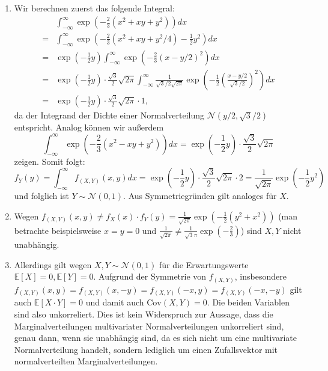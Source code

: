 \documentclass[a4paper]{article}
\begin{document}
\subsection{}

\begin{enumerate}
    \item Wir berechnen zuerst das folgende Integral:
    \begin{align*}
        &\int_{- \infty}^{\infty} \exp\left( - \frac{2}{3} (x^2 + xy + y^2) \right) dx\\
        = &\int_{- \infty}^{\infty} \exp\left( - \frac{2}{3} (x^2 + xy +  y^2/4) - \frac{1}{2} y^2 \right) dx\\
        = &\exp\left( - \frac{1}{2} y \right) \int_{- \infty}^{\infty} \exp\left( - \frac{2}{3} (x - y/2)^2 \right) dx\\
        = &\exp\left( - \frac{1}{2} y \right) \cdot \frac{\sqrt{3}}{2} \sqrt{2 \pi} \int_{- \infty}^{\infty} \frac{1}{\sqrt{3}/2 \sqrt{2 \pi}} \exp\left( - \frac{1}{2} \left( \frac{x - y/2}{\sqrt{3}/2} \right)^2 \right) dx\\
        = &\exp\left( - \frac{1}{2} y \right) \cdot \frac{\sqrt{3}}{2} \sqrt{2 \pi} \cdot 1\text{,}
    \end{align*}
    da der Integrand der Dichte einer Normalverteilung $\mathcal{N}(y/2, \sqrt{3}/2)$ entspricht. 
    Analog können wir außerdem
    \begin{equation*}
        \int_{- \infty}^{\infty} \exp\left( - \frac{2}{3} (x^2 - xy + y^2) \right) dx = \exp\left( - \frac{1}{2} y \right) \cdot \frac{\sqrt{3}}{2} \sqrt{2 \pi}
    \end{equation*}
    zeigen.
    Somit folgt:
    \begin{equation*}
        f_Y(y) = \int_{- \infty}^{\infty} f_{(X,Y)}(x,y) dx = \exp\left( - \frac{1}{2} y \right) \cdot \frac{\sqrt{3}}{2} \sqrt{2 \pi} \cdot 2 = \frac{1}{\sqrt{2 \pi}} \exp\left( - \frac{1}{2} y^2\right)
    \end{equation*}
    und folglich ist $Y \sim \mathcal{N}(0, 1)$. Aus Symmetriegründen gilt analoges für $X$.
    \item Wegen $f_{(X,Y)}(x,y) \neq f_X(x) \cdot f_Y(y) = \frac{1}{\sqrt{2 \pi}} \exp \left( - \frac{1}{2} (y^2 + x^2) \right)$ (man betrachte beispielsweise $x = y = 0$ und $\frac{1}{\sqrt{2 \pi}} \neq \frac{1}{\sqrt{3}\pi} \exp\left( - \frac{2}{3} \right)$) sind $X,Y$ nicht unabhängig.
    \item 
    Allerdings gilt wegen $X,Y \sim \mathcal{N}(0, 1)$ für die Erwartungswerte $\mathds{E}[X] = 0, \mathds{E}[Y] = 0$.
    Aufgrund der Symmetrie von $f_{(X,Y)}$, insbesondere $f_{(X,Y)}(x,y) =  f_{(X,Y)}(x,-y) = f_{(X,Y)}(-x,y) = f_{(X,Y)}(-x,-y)$ gilt auch $\mathds{E}[X \cdot Y] = 0$ und damit auch $\mathrm{Cov}(X,Y) = 0$.
    Die beiden Variablen sind also unkorreliert.
    Dies ist kein Widerspruch zur Aussage, dass die Marginalverteilungen multivariater Normalverteilungen unkorreliert sind, genau dann, wenn sie unabhängig sind, da es sich nicht um eine multivariate Normalverteilung handelt, sondern lediglich um einen Zufallsvektor mit normalverteilten Marginalverteilungen.
\end{enumerate}
\end{document}
